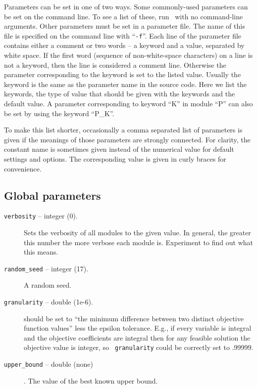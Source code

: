 \label{parameter_file}
Parameters can be set in one of two ways. Some commonly-used parameters can be
set on the command line. To see a list of these, run \BB\ with no command-line
arguments. Other parameters must be set in a parameter file. The name of this
file is specified on the command line with ``\texttt{-f}''.  Each line of the
parameter file contains either a comment or two words -- a keyword and a
value, separated by white space. If the first word (sequence of
non-white-space characters) on a line is not a keyword, then the line is
considered a comment line. Otherwise the parameter corresponding to the
keyword is set to the listed value. Usually the keyword is the same as the
parameter name in the source code. Here we list the keywords, the type of
value that should be given with the keywords and the default value. A
parameter corresponding to keyword ``K'' in module ``P'' can also be set by
using the keyword ``P\_K''.

To make this list shorter, occasionally a comma separated list of parameters
is given if the meanings of those parameters are strongly
connected. For clarity, the constant name is sometimes given instead
of the numerical value for default settings and options. The
corresponding value is given in curly braces for convenience.

\subsection{Global parameters}
\begin{description}

\item[{\tt verbosity} -- integer (0).]
Sets the verbosity of all modules to the given value. In general,
the greater this number the more verbose each module is. Experiment
to find out what this means.

\item[{\tt random\_seed} -- integer (17).]
A random seed.

\item[{\tt granularity} -- double (1e-6).]
should be set to ``the minimum difference between two distinct
objective function values'' less the epsilon tolerance. E.g., if every
variable is integral and the objective coefficients are integral then
for any feasible solution the objective value is integer, so {\tt
granularity} could be correctly set to .99999.

\item[{\tt upper\_bound} -- double (none)].
The value of the best known upper bound.

\end{description}


